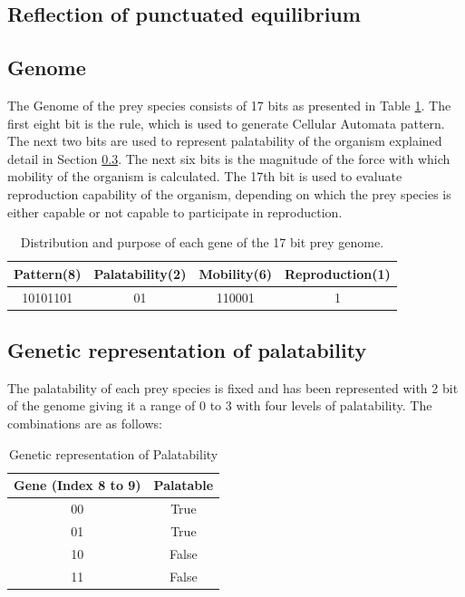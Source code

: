 \subsection{Reflection of punctuated equilibrium}

\subsection{Genome}
The Genome of the prey species consists of 17 bits as presented in Table \ref{tab:prey-genome}. The first eight bit is the rule, which is used to generate Cellular Automata pattern. The next two bits are used to represent palatability of the organism explained detail in Section \ref{sec:genetic-palatability-representation}. The next six bits is the magnitude of the force with which mobility of the organism is calculated. The 17th bit is used to evaluate reproduction capability of the organism, depending on which the prey species is either capable or not capable to participate in reproduction.

\begin{table}[H]
\centering
\begin{tabular}{|c|c|c|c|}
	\hline
		\textbf{Pattern(8)} & \textbf{Palatability(2)} & \textbf{Mobility(6)} & \textbf{Reproduction(1)} \\ \hline
		10101101					 	& 							01		 		 & 			110001					&					1						 		 \\ \hline
\end{tabular}
\caption{Distribution and purpose of each gene of the 17 bit prey genome.}
\label{tab:prey-genome}
\end{table}

\subsection{Genetic representation of palatability}
\label{sec:genetic-palatability-representation}
The palatability of each prey species is fixed and has been represented with 2 bit of the genome giving it a range of 0 to 3 with four levels of palatability. The combinations are as follows:

\begin{table}[H]
	\centering
	\begin{tabular}{|c|c|}
		\hline
			\textbf{Gene (Index 8 to 9)} &	\textbf{Palatable} \\ \hline
			00									& True 			\\ \hline
			01									& True 			\\ \hline
			10									& False 		\\ \hline
			11									& False 		\\
		\hline
	\end{tabular}
	\caption{Genetic representation of Palatability}
	\label{tab:genetic-representation-palatability}
\end{table}

